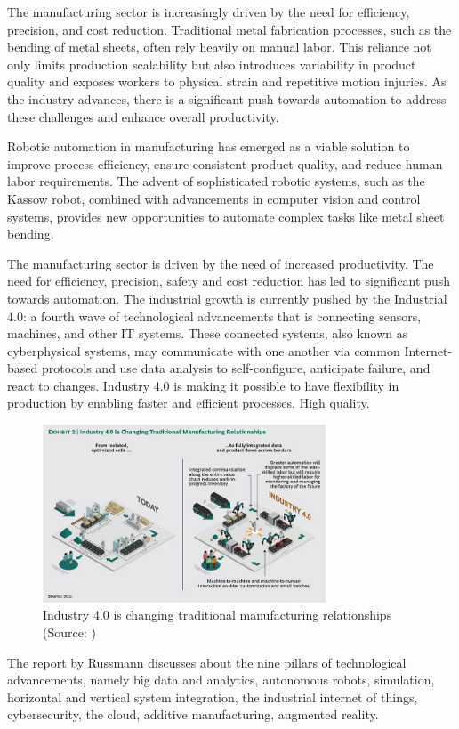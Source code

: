 The manufacturing sector is increasingly driven by the need for efficiency, precision, and cost reduction. Traditional metal fabrication processes, such as the bending of metal sheets, often rely heavily on manual labor. This reliance not only limits production scalability but also introduces variability in product quality and exposes workers to physical strain and repetitive motion injuries. As the industry advances, there is a significant push towards automation to address these challenges and enhance overall productivity.

Robotic automation in manufacturing has emerged as a viable solution to improve process efficiency, ensure consistent product quality, and reduce human labor requirements. The advent of sophisticated robotic systems, such as the Kassow robot, combined with advancements in computer vision and control systems, provides new opportunities to automate complex tasks like metal sheet bending.

The manufacturing sector is driven by the need of increased productivity. The need
for efficiency, precision, safety and cost reduction has led to significant push towards
automation. The industrial growth is currently pushed by the Industrial 4.0: a fourth wave
of technological advancements that is connecting sensors, machines, and other
IT systems. These connected systems, also known as cyberphysical systems, may communicate with one 
another via common Internet-based protocols and use data analysis to self-configure, anticipate 
failure, and react to changes. Industry 4.0 is making it possible to have
flexibility in production by enabling faster and efficient processes. 
High quality.

\begin{figure}[h]
    \centering
    \includegraphics[width=0.75\textwidth]{1. Introduction/1.1 Background/exhibit2.png}
    \caption{Industry 4.0 is changing traditional manufacturing relationships (Source: \cite{russmann2015industry})}
    \label{fig:background-exhibit-2}
\end{figure}


The report by Russmann \cite{russmann2015industry} discusses about the nine pillars
of technological advancements, namely big data and analytics, autonomous robots, simulation,
horizontal and vertical system integration, the industrial internet of things,
cybersecurity, the cloud, additive manufacturing, augmented reality.